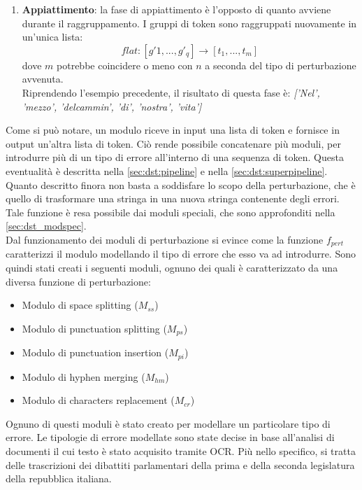 \begin{enumerate}
\item \textbf{Appiattimento}: la fase di appiattimento è l'opposto di quanto avviene durante il raggruppamento. I gruppi di token sono raggruppati nuovamente in un'unica lista:
\begin{equation}
flat: [g\prime1,...,g\prime_q] \rightarrow [t_1,...,t_m]
\end{equation}
dove $m$ potrebbe coincidere o meno con $n$ a seconda del tipo di perturbazione avvenuta.\\
Riprendendo l'esempio precedente, il risultato di questa fase è: \textit{['Nel', 'mezzo', 'delcammin', 'di', 'nostra', 'vita']}
\end{enumerate}

Come si può notare, un modulo riceve in input una lista di token e fornisce in output un'altra lista di token. Ciò rende possibile concatenare più moduli, per introdurre più di un tipo di errore all'interno di una sequenza di token. Questa eventualità è descritta nella \autoref{sec:dst:pipeline} e nella \autoref{sec:dst:superpipeline}.\\
Quanto descritto finora non basta a soddisfare lo scopo della perturbazione, che è quello di trasformare una stringa in una nuova stringa contenente degli errori. Tale funzione è resa possibile dai moduli speciali, che sono approfonditi nella \autoref{sec:dst_modspec}.\\
Dal funzionamento dei moduli di perturbazione si evince come la funzione $f_{pert}$ caratterizzi il modulo modellando il tipo di errore che esso va ad introdurre. Sono quindi stati creati i seguenti moduli, ognuno dei quali è caratterizzato da una diversa funzione di perturbazione:

\newcommand{\mss}{$M_{ss}$}
\newcommand{\mps}{$M_{ps}$}
\newcommand{\mpi}{$M_{pi}$}
\newcommand{\mhm}{$M_{hm}$}
\newcommand{\mcr}{$M_{cr}$}

\begin{itemize}
\item Modulo di space splitting (\mss)
\item Modulo di punctuation splitting (\mps)
\item Modulo di punctuation insertion (\mpi)
\item Modulo di hyphen merging (\mhm)
\item Modulo di characters replacement (\mcr)
\end{itemize}

Ognuno di questi moduli è stato creato per modellare un particolare tipo di errore. Le tipologie di errore modellate sono state decise in base all'analisi di documenti il cui testo è stato acquisito tramite OCR. Più nello specifico, si tratta delle trascrizioni dei dibattiti parlamentari della prima e della seconda legislatura della repubblica italiana.

